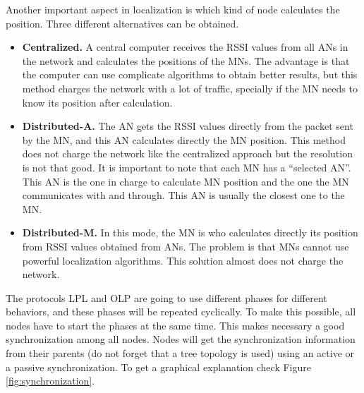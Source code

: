 Another important aspect in localization is which kind of node calculates the position. Three different alternatives can be obtained.

\begin{itemize}
 \item \textbf{Centralized.} A central computer receives the \ac{RSSI} values from all \acp{AN} in the network and calculates the positions of 
the \acp{MN}. The advantage is that the computer can use complicate algorithms to obtain better results, but this method 
charges the network with a lot of traffic, specially if the \ac{MN} needs to know its position after calculation.
 \item \textbf{Distributed-A.} The \ac{AN} gets the \ac{RSSI} values directly from the packet sent by the \ac{MN}, and this \ac{AN}
calculates directly the \ac{MN} position. This method does not charge the network like the centralized approach but the resolution 
is not that good. It is important to note that each \ac{MN} has a ``selected \ac{AN}''. This \ac{AN} is the one in charge to 
calculate \ac{MN} position and the one the \ac{MN} communicates with and through. This \ac{AN} is usually the closest one to 
the \ac{MN}.
 \item \textbf{Distributed-M.} In this mode, the \ac{MN} is who calculates directly its position from \ac{RSSI} values obtained from \acp{AN}.
The problem is that \acp{MN} cannot use powerful localization algorithms. This solution almost does not charge the network.
\end{itemize}

The protocols \ac{LPL} and \ac{OLP} are going to use different phases for different behaviors, and these phases will be repeated cyclically. To 
make this possible, all nodes have to start the phases at the same time. This makes necessary a good synchronization among all nodes.
Nodes will get the synchronization information from their parents (do not forget that a tree topology is used) using an active or a passive synchronization. 
To get a graphical explanation check Figure \ref{fig:synchronization}.


